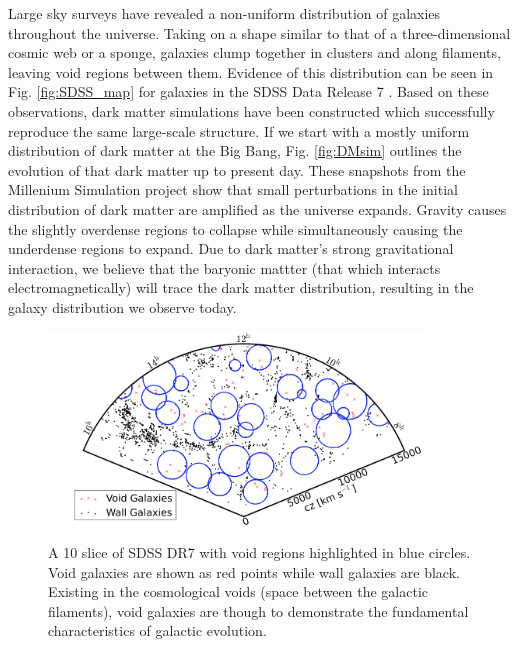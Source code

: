 Large sky surveys \citep[such as the Sloan Digital Sky Survey --- 
SDSS][]{York00} have revealed a non-uniform distribution of galaxies throughout 
the universe.  Taking on a shape similar to that of a three-dimensional cosmic 
web \citep{Bond96} or a sponge, galaxies clump together in clusters and along 
filaments, leaving void regions between them.  Evidence of this distribution can 
be seen in Fig. \ref{fig:SDSS_map} for galaxies in the SDSS Data Release 7 
\citep[SDSS DR7][]{Abazajian09}.  Based on these observations, dark matter 
simulations have been constructed which successfully reproduce the same 
large-scale structure.  If we start with a mostly uniform distribution of dark 
matter at the Big Bang, Fig. \ref{fig:DMsim} outlines the evolution of that dark 
matter up to present day.  These snapshots from the Millenium Simulation project 
\citep{Springel05} show that small perturbations in the initial distribution of 
dark matter are amplified as the universe expands.  Gravity causes the slightly 
overdense regions to collapse while simultaneously causing the underdense 
regions to expand.  Due to dark matter's strong gravitational interaction, we 
believe that the baryonic mattter (that which interacts electromagnetically) 
will trace the dark matter distribution, resulting in the galaxy distribution we 
observe today.


\begin{figure}
    \includegraphics[width=0.9\textwidth]{Images/Intro/VoidFinder}
    \caption[Sky map highlighting voids and void galaxies]{A 10 \hMpc slice of 
    SDSS DR7 \citep[Fig. 1]{Moorman14} with void regions highlighted in blue 
    circles.  Void galaxies are shown as red points while wall galaxies are 
    black.  Existing in the cosmological voids (space between the galactic 
    filaments), void galaxies are though to demonstrate the fundamental 
    characteristics of galactic evolution.}
\end{figure}

